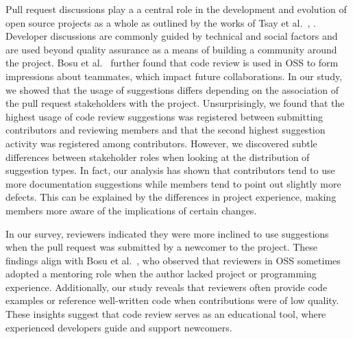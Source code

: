 Pull request discussions play a a central role in the development and evolution of open source projects as a whole as outlined by the works of Tsay et al.~\cite{Tsay_Discussions_GitHub_2014}, \cite{Tsay_Social_Factors_2014}.
Developer discussions are commonly guided by technical and social factors and are used beyond quality assurance as a means of building a community around the project.
Bosu et al.~\cite{BosuCodeReviewOSSMicrosoft} further found that code review is used in OSS to form impressions about teammates, which impact future collaborations.
In our study, we showed that the usage of suggestions differs depending on the association of the pull request stakeholders with the project.
Unsurprisingly, we found that the highest usage of code review suggestions was registered between submitting contributors and reviewing members and that the second highest suggestion activity was registered among contributors.
However, we discovered subtle differences between stakeholder roles when looking at the distribution of suggestion types.
In fact, our analysis has shown that contributors tend to use more documentation suggestions  while members tend to point out slightly more defects. 
This can be explained by the differences in project experience, making members more aware of the implications of certain changes.

In our survey, reviewers indicated they were more inclined to use suggestions when the pull request was submitted by a newcomer to the project.
These findings align with Bosu et al.~\cite{BosuCodeReviewOSSMicrosoft}, who observed that reviewers in OSS sometimes adopted a mentoring role when the author lacked project or programming experience. 
Additionally, our study reveals that reviewers often provide code examples or reference well-written code  when contributions were of low quality. 
These insights suggest that code review serves as an educational tool, where experienced developers guide and support newcomers.

